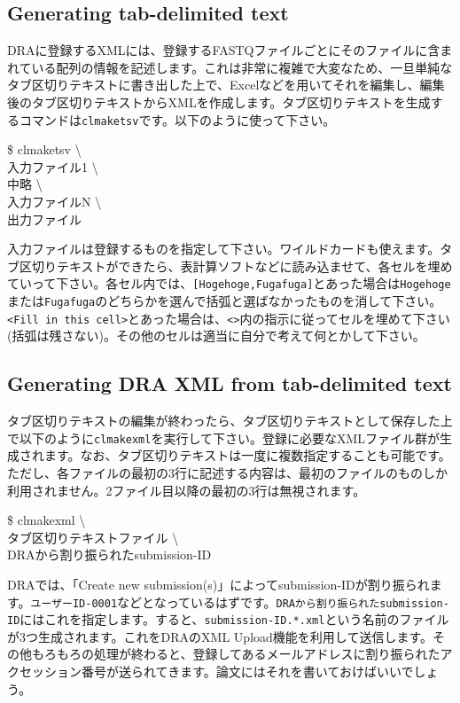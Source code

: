 \documentclass[titlepage,10pt,a4paper,english]{jsbook}
\newenvironment{cmd}{\begin{oframed}\raggedright\ttfamily\footnotesize\setlength{\baselineskip}{1.4em}}{\end{oframed}\vspace{-1em}}
\begin{document}
\subsection{Generating tab-delimited text}

DRAに登録するXMLには、登録するFASTQファイルごとにそのファイルに含まれている配列の情報を記述します。これは非常に複雑で大変なため、一旦単純なタブ区切りテキストに書き出した上で、Excelなどを用いてそれを編集し、編集後のタブ区切りテキストからXMLを作成します。タブ区切りテキストを生成するコマンドは\texttt{clmaketsv}です。以下のように使って下さい。
\begin{cmd}
\$ clmaketsv {\textbackslash}\\
入力ファイル1 {\textbackslash}\\
中略 {\textbackslash}\\
入力ファイルN {\textbackslash}\\
出力ファイル
\end{cmd}
入力ファイルは登録するものを指定して下さい。ワイルドカードも使えます。タブ区切りテキストができたら、表計算ソフトなどに読み込ませて、各セルを埋めていって下さい。各セル内では、\texttt{[Hogehoge,Fugafuga]}とあった場合は\texttt{Hogehoge}または\texttt{Fugafuga}のどちらかを選んで括弧と選ばなかったものを消して下さい。\texttt{{\textless}Fill in this cell{\textgreater}}とあった場合は、\texttt{{\textless}{\textgreater}}内の指示に従ってセルを埋めて下さい(括弧は残さない)。その他のセルは適当に自分で考えて何とかして下さい。

\subsection{Generating DRA XML from tab-delimited text}

タブ区切りテキストの編集が終わったら、タブ区切りテキストとして保存した上で以下のように\texttt{clmakexml}を実行して下さい。登録に必要なXMLファイル群が生成されます。なお、タブ区切りテキストは一度に複数指定することも可能です。ただし、各ファイルの最初の3行に記述する内容は、最初のファイルのものしか利用されません。2ファイル目以降の最初の3行は無視されます。
\begin{cmd}
\$ clmakexml {\textbackslash}\\
タブ区切りテキストファイル {\textbackslash}\\
DRAから割り振られたsubmission-ID
\end{cmd}
DRAでは、「Create new submission(s)」によってsubmission-IDが割り振られます。\texttt{ユーザーID-0001}などとなっているはずです。\texttt{DRAから割り振られたsubmission-ID}にはこれを指定します。すると、\texttt{submission-ID.*.xml}という名前のファイルが3つ生成されます。これをDRAのXML Upload機能を利用して送信します。その他もろもろの処理が終わると、登録してあるメールアドレスに割り振られたアクセッション番号が送られてきます。論文にはそれを書いておけばいいでしょう。
\end{document}
